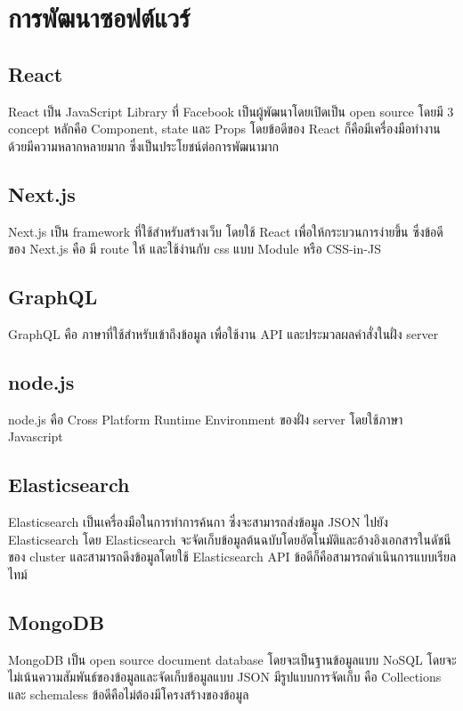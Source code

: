 \section{การพัฒนาซอฟต์แวร์}
\subsection{React}
React เป็น JavaScript Library ที่ Facebook เป็นผู้พัฒนาโดยเปิดเป็น open source โดยมี 3 concept หลักคือ Component, state และ Props โดยข้อดีของ React ก็คือมีเครื่องมือทำงานด้วยมีความหลากหลายมาก ซึ่งเป็นประโยชน์ต่อการพัฒนามาก \cite{react}

\subsection{Next.js}
Next.js เป็น framework ที่ใช้สำหรับสร้างเว็บ โดยใช้ React เพื่อให้กระบวนการง่ายขึ้น ซึ่งข้อดีของ Next.js คือ มี route ให้ และใช้ง่านกับ css แบบ Module หรือ CSS-in-JS \cite{nextjs}

\subsection{GraphQL}
GraphQL คือ ภาษาที่ใช้สำหรับเข้าถึงข้อมูล เพื่อใช้งาน API และประมวลผลคำสั่งในฝั่ง server \cite{graphql}

\subsection{node.js}
node.js คือ  Cross Platform Runtime Environment ของฝั่ง server โดยใช้ภาษา Javascript \cite{nodejs}

\subsection{Elasticsearch}
Elasticsearch เป็นเครื่องมือในการทำการค้นกา ซึ่งจะสามารถส่งข้อมูล JSON ไปยัง Elasticsearch โดย Elasticsearch จะจัดเก็บข้อมูลต้นฉบับโดยอัตโนมัติและอ้างอิงเอกสารในดัชนีของ cluster และสามารถดึงข้อมูลโดยใช้ Elasticsearch API ข้อดีก็คือสามารถดำเนินการแบบเรียลไทม์\cite{elastic}

\subsection{MongoDB}
MongoDB เป็น open source document database โดยจะเป็นฐานข้อมูลแบบ NoSQL โดยจะไม่เน้นความสัมพันธ์ของข้อมูลและจัดเก็บข้อมูลแบบ JSON มีรูปแบบการจัดเก็บ คือ Collections และ schemaless ข้อดีคือไม่ต้องมีโครงสร้างของข้อมูล \cite{mongodb}

